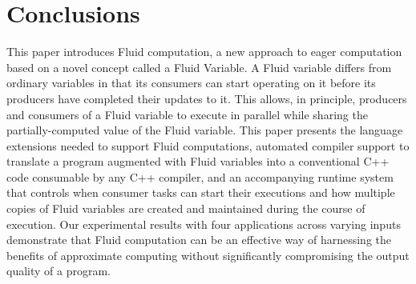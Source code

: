 
\section{Conclusions}
\label{sec:conc}
This paper introduces Fluid computation, a new approach to eager computation based on a novel concept called a Fluid Variable. A Fluid variable differs from ordinary variables in that its consumers can start operating on it before its producers have completed their updates to it. This allows, in principle, producers and consumers of a Fluid variable to execute in parallel while sharing the partially-computed value of the Fluid variable. This paper presents the language extensions needed to support Fluid computations, automated compiler support to translate a program augmented with Fluid variables into a conventional C++ code consumable by any C++ compiler, and an accompanying runtime system that controls when consumer tasks can start their executions and how multiple copies of Fluid variables are created and maintained during the course of execution. Our experimental results with four applications across varying inputs demonstrate that Fluid computation can be an effective way of harnessing the benefits of approximate computing without significantly compromising the output quality of a program. 





